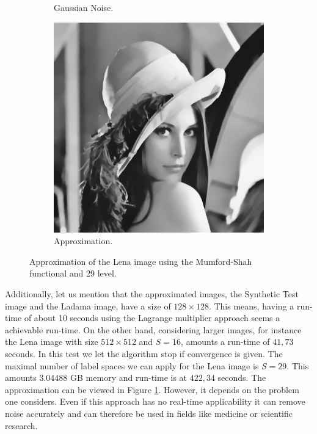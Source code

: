 \documentclass[abstracton]{scrreprt}
\begin{document}
\begin{figure}[!ht]
\begin{subfigure}[b]{0.3\textwidth}
                    \caption{Gaussian Noise.}
                \end{subfigure}
                \begin{subfigure}[b]{0.3\textwidth}
                    \includegraphics[width=\textwidth]{img/lagrange/lena_25level.png}
                    \caption{Approximation.}
                \end{subfigure}
                \caption[Mumford-Shah approximation of Lena using 29 level.]{Approximation of the Lena image using the Mumford-Shah functional and 29 level.}
            \label{fig:lena_ms}
            \end{figure}
            Additionally, let us mention that the approximated images, the Synthetic Test image and the Ladama image, have a size of $128 \times 128$. This means, having a run-time of about 10 seconds using the Lagrange multiplier approach seems a achievable run-time. On the other hand, considering larger images, for instance the Lena image with size $512 \times 512$ and $S = 16$, amounts a run-time of $41,73$ seconds. In this test we let the algorithm stop if convergence is given. The maximal number of label spaces we can apply for the Lena image is $S = 29$. This amounts $3.04488$ GB memory and run-time is at $422,34$ seconds. The approximation can be viewed in Figure \ref{fig:lena_ms}. However, it depends on the problem one considers. Even if this approach has no real-time applicability it can remove noise accurately and can therefore be used in fields like medicine or scientific research.
\end{document}
